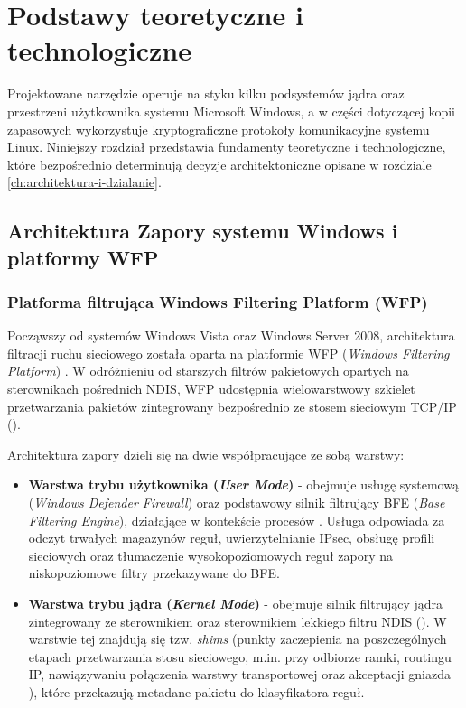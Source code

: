 \chapter{Podstawy teoretyczne i technologiczne}\label{ch:podstawy-technologiczne}

Projektowane narzędzie operuje na styku kilku podsystemów jądra oraz przestrzeni użytkownika systemu Microsoft Windows, a w części dotyczącej kopii zapasowych wykorzystuje kryptograficzne protokoły komunikacyjne systemu Linux. Niniejszy rozdział przedstawia fundamenty teoretyczne i technologiczne, które bezpośrednio determinują decyzje architektoniczne opisane w rozdziale \ref{ch:architektura-i-dzialanie}.

\section{Architektura Zapory systemu Windows i platformy WFP}\label{sec:architektura-zapory}

\subsection{Platforma filtrująca Windows Filtering Platform (WFP)}\label{subsec:architektura-wfp}

Począwszy od systemów Windows Vista oraz Windows Server 2008, architektura filtracji ruchu sieciowego została oparta na platformie WFP (\textit{Windows Filtering Platform}) \cite{ms-wfp}. W odróżnieniu od starszych filtrów pakietowych opartych na sterownikach pośrednich NDIS, WFP udostępnia wielowarstwowy szkielet przetwarzania pakietów zintegrowany bezpośrednio ze stosem sieciowym TCP/IP ().

Architektura zapory dzieli się na dwie współpracujące ze sobą warstwy:
\begin{itemize}
    \item \textbf{Warstwa trybu użytkownika (\textit{User Mode})} - obejmuje usługę systemową  (\textit{Windows Defender Firewall}) oraz podstawowy silnik filtrujący BFE (\textit{Base Filtering Engine}), działające w kontekście procesów . Usługa  odpowiada za odczyt trwałych magazynów reguł, uwierzytelnianie IPsec, obsługę profili sieciowych oraz tłumaczenie wysokopoziomowych reguł zapory na niskopoziomowe filtry przekazywane do BFE.
    \item \textbf{Warstwa trybu jądra (\textit{Kernel Mode})} - obejmuje silnik filtrujący jądra zintegrowany ze sterownikiem  oraz sterownikiem lekkiego filtru NDIS (). W warstwie tej znajdują się tzw. \textit{shims} (punkty zaczepienia na poszczególnych etapach przetwarzania stosu sieciowego, m.in. przy odbiorze ramki, routingu IP, nawiązywaniu połączenia warstwy transportowej  oraz akceptacji gniazda ), które przekazują metadane pakietu do klasyfikatora reguł.
\end{itemize}

